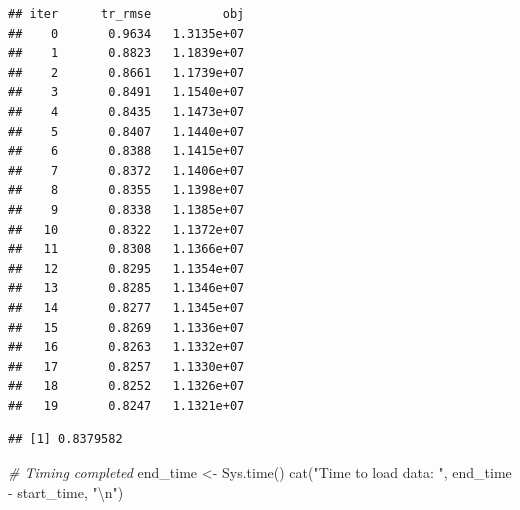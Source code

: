 \documentclass[
]{article}
\newenvironment{Shaded}{}{}
\newcommand{\CommentTok}[1]{\textcolor[rgb]{0.38,0.63,0.69}{\textit{#1}}}
\newcommand{\DecValTok}[1]{\textcolor[rgb]{0.25,0.63,0.44}{#1}}
\newcommand{\FunctionTok}[1]{\textcolor[rgb]{0.02,0.16,0.49}{#1}}
\newcommand{\NormalTok}[1]{#1}
\newcommand{\OtherTok}[1]{\textcolor[rgb]{0.00,0.44,0.13}{#1}}
\newcommand{\SpecialCharTok}[1]{\textcolor[rgb]{0.25,0.44,0.63}{#1}}
\newcommand{\StringTok}[1]{\textcolor[rgb]{0.25,0.44,0.63}{#1}}
\begin{document}
\begin{verbatim}
## iter      tr_rmse          obj
##    0       0.9634   1.3135e+07
##    1       0.8823   1.1839e+07
##    2       0.8661   1.1739e+07
##    3       0.8491   1.1540e+07
##    4       0.8435   1.1473e+07
##    5       0.8407   1.1440e+07
##    6       0.8388   1.1415e+07
##    7       0.8372   1.1406e+07
##    8       0.8355   1.1398e+07
##    9       0.8338   1.1385e+07
##   10       0.8322   1.1372e+07
##   11       0.8308   1.1366e+07
##   12       0.8295   1.1354e+07
##   13       0.8285   1.1346e+07
##   14       0.8277   1.1345e+07
##   15       0.8269   1.1336e+07
##   16       0.8263   1.1332e+07
##   17       0.8257   1.1330e+07
##   18       0.8252   1.1326e+07
##   19       0.8247   1.1321e+07
\end{verbatim}

\begin{Shaded}
\end{Shaded}

\begin{verbatim}
## [1] 0.8379582
\end{verbatim}

\begin{Shaded}
\begin{Highlighting}[]
\CommentTok{\# Timing completed}
\NormalTok{end\_time }\OtherTok{\textless{}{-}} \FunctionTok{Sys.time}\NormalTok{()}
\FunctionTok{cat}\NormalTok{(}\StringTok{"Time to load data: "}\NormalTok{, end\_time }\SpecialCharTok{{-}}\NormalTok{ start\_time, }\StringTok{"}\SpecialCharTok{\textbackslash{}n}\StringTok{"}\NormalTok{)}
\end{Highlighting}
\end{Shaded}
\end{document}
